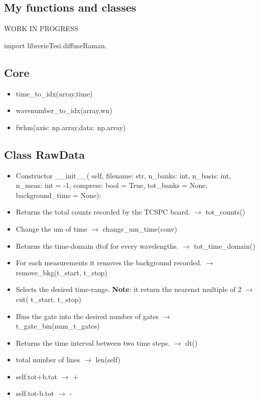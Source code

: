 \documentclass{article}
\begin{document}
\newpage
\begin{multicols}{2}


\section{My functions and classes}
WORK IN PROGRESS

import librerieTesi.diffuseRaman.

\subsection{Core}

\begin{itemize}
\item time\_to\_idx(array,time)
\item wavenumber\_to\_idx(array,wn)
\item fwhm(axis: np.array,data: np.array)
\end{itemize}
\subsection{Class RawData}
\begin{itemize}
\item Constructor \_\_init\_\_(
            self,
            filename: str,
            n\_banks: int,
            n\_basis: int,
            n\_meas: int = -1,
            compress: bool = True,
            tot\_banks = None,
            background\_time = None):
\item Returns the total counts recorded by the TCSPC board. $\rightarrow$ tot\_counts()  
\item Change the um of time $\rightarrow$ change\_um\_time(conv)
\item  Returns the time-domain dtof for every wavelengths. $\rightarrow$ tot\_time\_domain()
\item  For each measurements it removes the background recorded. $\rightarrow$ remove\_bkg(t\_start, t\_stop)
\item Selects the desired time-range. \textbf{Note}: it return the nearenst multiple of 2 $\rightarrow$ cut( t\_start, t\_stop)
\item Bins the gate into the desired number of gates $\rightarrow$ t\_gate\_bin(num\_t\_gates)
\item Returns the time interval between two time steps. $\rightarrow$ dt()
\item total number of lines $\rightarrow$ len(self)
\item self.tot+b.tot $\rightarrow$ +
\item self.tot-b.tot $\rightarrow$ -
\end{itemize}

\end{multicols}
\end{document}
